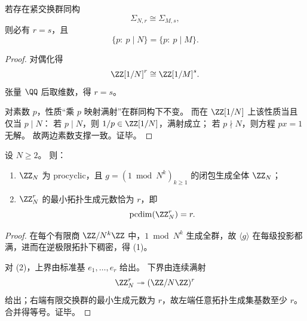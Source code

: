 \begin{proposition}\label{prop:cdim-solenoid-rigidity-rank-prime-support}
若存在紧交换群同构
\[
\Sigma_{N,r}\cong \Sigma_{M,s},
\]
则必有 \(r=s\)，且
\[
\{p:\ p\mid N\}=\{p:\ p\mid M\}.
\]
\end{proposition}

\begin{proof}
对偶化得
\[
\ZZ[1/N]^r\cong \ZZ[1/M]^s.
\]
张量 \(\QQ\) 后取维数，得 \(r=s\)。

对素数 \(p\)，性质“乘 \(p\) 映射满射”在群同构下不变。
而在 \(\ZZ[1/N]\) 上该性质当且仅当 \(p\mid N\)：
若 \(p\mid N\)，则 \(1/p\in\ZZ[1/N]\)，满射成立；
若 \(p\nmid N\)，则方程 \(px=1\) 无解。
故两边素数支撑一致。证毕。
\end{proof}





\begin{theorem}\label{thm:cdim-zn-procyclic-and-min-generators}
设 \(N\ge 2\)。
则：
\begin{enumerate}
  \item \(\ZZ_N\) 为 procyclic，且 \(g=(1\bmod N^k)_{k\ge 1}\) 的闭包生成全体 \(\ZZ_N\)；
  \item \(\ZZ_N^r\) 的最小拓扑生成元数恰为 \(r\)，即
  \[
  \pcdim(\ZZ_N^r)=r.
  \]
\end{enumerate}
\end{theorem}

\begin{proof}
在每个有限商 \(\ZZ/N^k\ZZ\) 中，\(1\bmod N^k\) 生成全群，故 \(\langle g\rangle\) 在每级投影都满，进而在逆极限拓扑下稠密，得 (1)。

对 (2)，上界由标准基 \(e_1,\dots,e_r\) 给出。
下界由连续满射
\[
\ZZ_N^r\twoheadrightarrow (\ZZ/N\ZZ)^r
\]
给出；右端有限交换群的最小生成元数为 \(r\)，故左端任意拓扑生成集基数至少 \(r\)。
合并得等号。证毕。
\end{proof}

